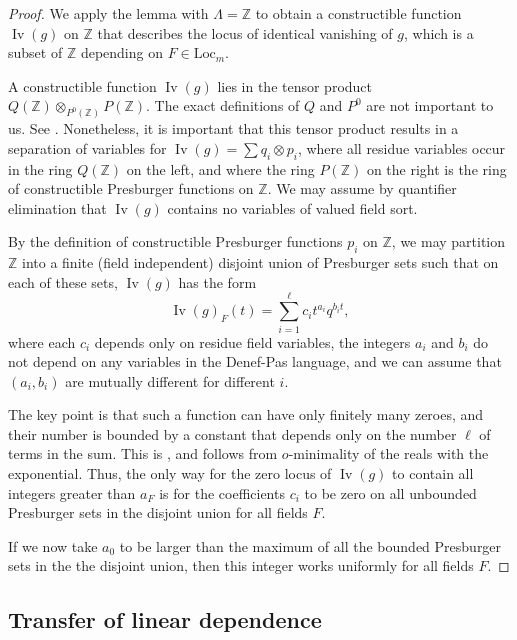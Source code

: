 \documentclass[12pt]{amsart}
\newcommand{\op}[1]{\operatorname{#1}}
\newcommand{\ring}[1]{{\mathbb #1}}
\newcommand{\locus}[1]{\op{Iv}(#1)}
\newcommand{\Loc}{\mathrm{Loc}}
\theoremstyle{plain}
\theoremstyle{definition}
\begin{document}
\begin{proof}
  We apply the lemma with $\Lambda=\ring{Z}$ to obtain a constructible
  function $\locus{g}$ on $\ring{Z}$ that describes the locus of
  identical vanishing of $g$, which is a subset of $\ring{Z}$
  depending on $F\in\Loc_m$.

  A constructible function $\locus{g}$ lies in the tensor product
  $Q(\ring{Z})\otimes_{P^0(\ring{Z})} P(\ring{Z})$.  The exact
  definitions of $Q$ and $P^0$ are not important to us.  See
  \cite{CGH1}.  Nonetheless, it is important that this tensor product
  results in a separation of variables for $\locus{g} = \sum q_i
  \otimes p_i$, where all residue variables occur in the ring
  $Q(\ring{Z})$ on the left, and where the ring $P(\ring{Z})$ on the
  right is the ring of constructible Presburger functions on
  $\ring{Z}$.  We may assume by quantifier elimination that
  $\locus{g}$ contains no variables of valued field sort.

By the definition of constructible Presburger functions $p_i$ on
$\ring{Z}$, we may partition $\ring{Z}$ into a finite (field
independent) disjoint union of Presburger sets such that on each of
these sets, $\locus{g}$ has the form
\[
\locus{g}_F(t) = \sum_{i=1}^\ell c_i t^{a_i} q^{b_i t},
\]
where each $c_i$ depends only on residue field variables, the integers
$a_i$ and $b_i$ do not depend on any variables in the Denef-Pas
language, and we can assume that $(a_i,b_i)$ are mutually different
for different $i$.

The key point is that such a function can have only finitely many
zeroes, and their number is bounded by a constant that depends only on
the number $\ell$ of terms in the sum.  This is \cite[Lemma 2.1.7]{CGH1},
and follows from $o$-minimality of the reals with the exponential.
Thus, the only way for the zero locus of $\locus{g}$ to contain all integers
greater than $a_F$ is for the coefficients $c_i$ to be zero on all
unbounded Presburger sets in the disjoint union for all fields $F$.

If we now take $a_0$ to be larger than the maximum of all the bounded
Presburger sets in the the disjoint union, then this integer works
uniformly for all fields $F$.
\end{proof}

\subsection{Transfer of linear dependence}
\end{document}

